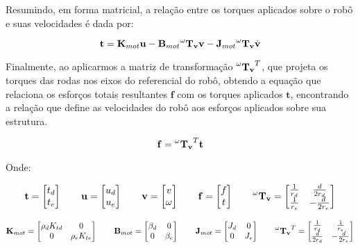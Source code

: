 Resumindo, em forma matricial, 
a relação entre os torques aplicados sobre o robô
e suas velocidades é dada por:

\begin{equation}
\mathbf{t}
=
\mathbf{K}_{mot} \mathbf{u}
-
\mathbf{B}_{mot} \mathbf{\prescript{\omega}{}{T_v}} \mathbf{v}
-
\mathbf{J}_{mot} \mathbf{\prescript{\omega}{}{T_v}} \dot{\mathbf{v}}
\label{eq:force_torque}
\end{equation}

Finalmente, ao aplicarmos a matriz de transformação $\mathbf{\prescript{\omega}{}{T_v}}^T$, 
que projeta os torques das rodas nos eixos do referencial do robô, obtendo
 a equação que relaciona os esforços totais resultantes 
$\mathbf{f}$ com os torques aplicados $\mathbf{t}$, 
encontrando a relação que define as velocidades do robô aos esforços aplicados sobre sua estrutura.

\begin{equation}
\mathbf{f}
=
\mathbf{\prescript{\omega}{}{T_v}}^T \mathbf{t}
\end{equation}

Onde:

\[
\mathbf{t} =
\begin{bmatrix}
t_d \\
t_e
\end{bmatrix}
\qquad
\mathbf{u} =
\begin{bmatrix}
u_d \\
u_e
\end{bmatrix}
\qquad
\mathbf{v} =
\begin{bmatrix}
v \\
\omega
\end{bmatrix}
\qquad
\mathbf{f} =
\begin{bmatrix}
f \\
t
\end{bmatrix}
\qquad
\mathbf{\prescript{\omega}{}{T_v}} =
\begin{bmatrix}
\frac{1}{r_d} & \frac{d}{2r_d} \\
\frac{1}{r_e} & -\frac{d}{2r_e}
\end{bmatrix}
\]

\[
\mathbf{K}_{mot} =
\begin{bmatrix}
\rho_d K_{t d} & 0 \\
0 & \rho_e K_{t e}
\end{bmatrix}
\qquad
\mathbf{B}_{mot} =
\begin{bmatrix}
\beta_d & 0 \\
0 & \beta_e
\end{bmatrix}
\qquad
\mathbf{J}_{mot} =
\begin{bmatrix}
J_d & 0 \\
0 & J_e
\end{bmatrix}
\qquad
\mathbf{\prescript{\omega}{}{T_v}}^T =
\begin{bmatrix}
\frac{1}{r_d} & \frac{1}{r_e} \\
\frac{d}{2r_d} & -\frac{d}{2r_e}
\end{bmatrix}
\]


